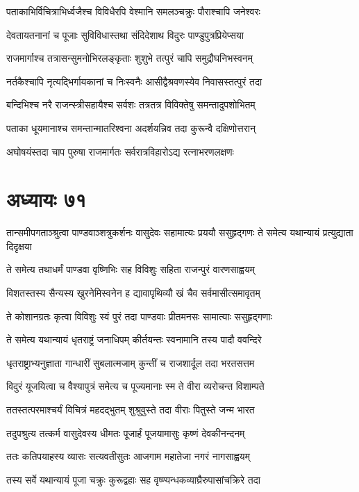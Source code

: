 \twolineshloka
{पताकाभिर्विचित्राभिर्ध्वजैश्च विविधैरपि}
{वेश्मानि समलञ्चक्रुः पौराश्चापि जनेश्वरः}


\twolineshloka
{देवतायतनानां च पूजाः सुविविधास्तथा}
{संदिदेशाथ विदुरः पाण्डुपुत्रप्रियेप्सया}


\twolineshloka
{राजमार्गाश्च तत्रासन्सुमनोभिरलङ्कृताः}
{शुशुभे तत्पुरं चापि समुद्रौघनिभस्वनम्}


\twolineshloka
{नर्तकैश्चापि नृत्यद्भिर्गायकानां च निःस्वनैः}
{आसीद्वैश्रवणस्येव निवासस्तत्पुरं तदा}


\twolineshloka
{बन्दिभिश्च नरै राजन्स्त्रीसहायैश्च सर्वशः}
{तत्रतत्र विविक्तेषु समन्तादुपशोभितम्}


\twolineshloka
{पताका धूयमानाश्च समन्तान्मातरिश्वना}
{अदर्शयन्निव तदा कुरून्वै दक्षिणोत्तरान्}


\twolineshloka
{अघोषयंस्तदा चाप पुरुषा राजमार्गतः}
{सर्वरात्रविहारोऽद्य रत्नाभरणलक्षणः}


\chapter{अध्यायः ७१}
\threelineshloka
{तान्समीपगताञ्श्रुत्वा पाण्डवाञ्शत्रुकर्शनः}
{वासुदेवः सहामात्यः प्रययौ ससुहृद्गणः}
{ते समेत्य यथान्यायं प्रत्युद्याता दिदृक्षया}


\twolineshloka
{ते समेत्य तथाधर्मं पाण्डवा वृष्णिभिः सह}
{विविशुः सहिता राजन्पुरं वारणसाह्वयम्}


\twolineshloka
{विशतस्तस्य सैन्यस्य खुरनेमिस्वनेन ह}
{द्यावापृथिव्यौ खं चैव सर्वमासीत्समावृतम्}


\twolineshloka
{ते कोशानग्रतः कृत्वा विविशुः स्वं पुरं तदा}
{पाण्डवाः प्रीतमनसः सामात्याः ससुहृद्गणाः}


\twolineshloka
{ते समेत्य यथान्यायं धृतराष्ट्रं जनाधिपम्}
{कीर्तयन्तः स्वनामानि तस्य पादौ ववन्दिरे}


\twolineshloka
{धृतराष्ट्राभ्यनुज्ञाता गान्धारीं सुबलात्मजाम्}
{कुन्तीं च राजशार्दूल तदा भरतसत्तम}


\twolineshloka
{विदुरं यूजयित्वा च वैश्यापुत्रं समेत्य च}
{पूज्यमानाः स्म ते वीरा व्यरोचन्त विशाम्पते}


\twolineshloka
{ततस्तत्परमाश्चर्यं विचित्रं महदद्भुतम्}
{शुश्रुवुस्ते तदा वीराः पितुस्ते जन्म भारत}


\twolineshloka
{तदुपश्रुत्य तत्कर्म वासुदेवस्य धीमतः}
{पूजार्हं पूजयामासुः कृष्णं देवकीनन्दनम्}


\twolineshloka
{ततः कतिपयाहस्य व्यासः सत्यवतीसुतः}
{आजगाम महातेजा नगरं नागसाह्वयम्}


\twolineshloka
{तस्य सर्वे यथान्यायं पूजा चक्रुः कुरूद्वहाः}
{सह वृष्ण्यन्धकव्याघ्रैरुपासांचक्रिरे तदा}


